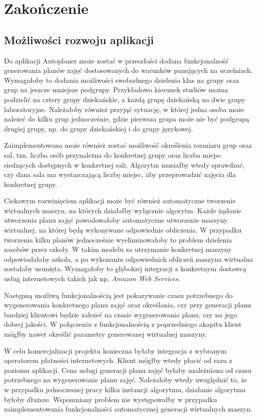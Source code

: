 
\chapter{Zakończenie}

\section{Możliwości rozwoju aplikacji}

Do aplikacji Autoplaner może zostać w przeszłości dodana funkcjonalność generowania planów zajęć dostosowanych do warunków panujących na uczelniach. Wymagałoby to dodania możliwości swobodnego dzielenia klas na grupy oraz grup na jeszcze mniejsze podgrupy. Przykładowo kierunek studiów można podzielić na cztery grupy dziekańskie, a każdą grupę dziekańską na dwie grupy laboratoryjne. Należałoby również przyjąć sytuację, w której jedna osoba może należeć do kilku grup jednocześnie, gdzie pierwsza grupa może nie być podgrupą drugiej grupy, np. do grupy dziekańskiej i do grupy językowej.

Zaimplementowana może również zostać możliwość określenia rozmiaru grup oraz sal, tzn. liczba osób przynależna do konkretnej grupy oraz liczba miejsc siedzących dostępnych w konkretnej sali. Algorytm musiałby wtedy sprawdzać, czy dana sala ma wystarczającą liczbę miejsc, aby przeprowadzić zajęcia dla konkretnej grupy.

Ciekawym rozwinięciem aplikacji może być również automatyczne tworzenie wirtualnych maszyn, na których działałby wyłącznie algorytm. Każde żądanie utworzenia planu zajęć powodowałoby automatyczne utworzenie maszyny wirtualnej, na której będą wykonywane odpowiednie obliczenia. W przypadku tworzenia kilku planów jednocześnie wyeliminowałoby to problem dzielenia zasobów przez szkoły. W takim modelu za utrzymanie konkretnej maszyny odpowiadałaby szkoła, a po wykonaniu odpowiednich obliczeń maszyna wirtualna zostałaby usunięta. Wymagałoby to głębokiej integracji z konkretnym dostawcą usług internetowych takich jak np. \textit{Amazon Web Services}.

Następną możliwą funkcjonalnością jest pokazywanie czasu potrzebnego do wygenerowania konkretnego planu zajęć oraz określania, czy przy generacji planu bardziej klientowi będzie zależeć na czasie wygenerowania planu, czy na jego dobrej jakości. W połączeniu z funkcjonalnością z poprzedniego akapitu klient mógłby nawet określić parametry generowanej wirtualnej maszyny.

W celu komercjalizacji projektu konieczna byłaby integracja z wybranym operatorem płatności internetowych. Klient mógłby wtedy płacić od razu z poziomu aplikacji. Cena usługi generacji planu zajęć byłaby uzależniona od czasu potrzebnego na wygenerowanie planu zajęć. Należałoby wtedy uwzględnić to, że w przypadku jednoczesnej pracy kilku instancji algorytmu, działanie algorytmu byłoby dłuższe. Wspomniany problem nie występowałby w przypadku zaimplementowania funkcjonalności automatycznej generacji wirtualnych maszyn.